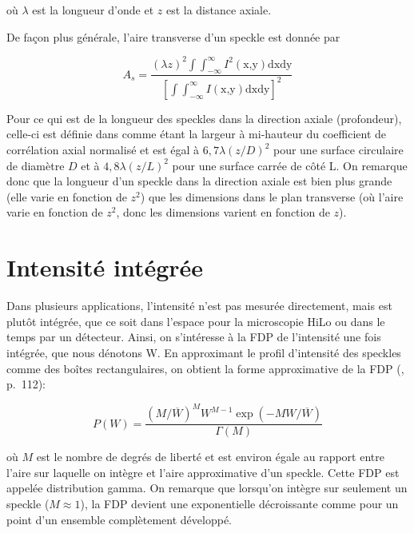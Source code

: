 \documentclass{article}       %
\begin{document}
où $\lambda$ est la longueur d'onde et $z$ est la distance axiale.

De façon plus générale, l'aire transverse d'un speckle est donnée par

\begin{equation}
    A_{s} = \frac{(\lambda z)^{2}\int\int_{-\infty}^{\infty}I^{2}(\text{x,y})\text{dxdy}}{\left[\int\int_{-\infty}^{\infty}I(\text{x,y})\text{dxdy}\right]^2}
\end{equation}

Pour ce qui est de la longueur des speckles dans la direction axiale (profondeur), celle-ci est définie dans \cite{Manuel} comme étant la largeur à mi-hauteur du coefficient de corrélation axial normalisé et est égal à $6,7\lambda(z/D)^2$ pour une surface circulaire de diamètre $D$ et à $4,8\lambda(z/L)^2$ pour une surface carrée de côté L. On remarque donc que la longueur d'un speckle dans la direction axiale est bien plus grande (elle varie en fonction de $z^2$) que les dimensions dans le plan transverse (où l'aire varie en fonction de $z^2$, donc les dimensions varient en fonction de $z$).\\

\bigskip

\section{Intensité intégrée}

Dans plusieurs applications, l'intensité n'est pas mesurée directement, mais est plutôt intégrée, que ce soit dans l'espace pour la microscopie HiLo ou dans le temps par un détecteur. Ainsi, on s'intéresse à la FDP de l'intensité une fois intégrée, que nous dénotons W. En approximant le profil d'intensité des speckles comme des boîtes rectangulaires, on obtient la forme approximative de la FDP (\cite{Manuel}, p.~112):

\begin{equation}
\label{Eq:IntIntUn}
    P(W) = \frac{(M/\overline{W})^{M}W^{M-1}\exp(-MW/\overline{W})}{\Gamma(M)}
\end{equation}

où $M$ est le nombre de degrés de liberté et est environ égale au rapport entre l'aire sur laquelle on intègre et l'aire approximative d'un speckle. Cette FDP est appelée 
distribution gamma. On remarque que lorsqu'on intègre sur seulement un speckle ($M\approx1$), la FDP devient une exponentielle décroissante comme pour un point d'un ensemble complètement développé.
\end{document}
